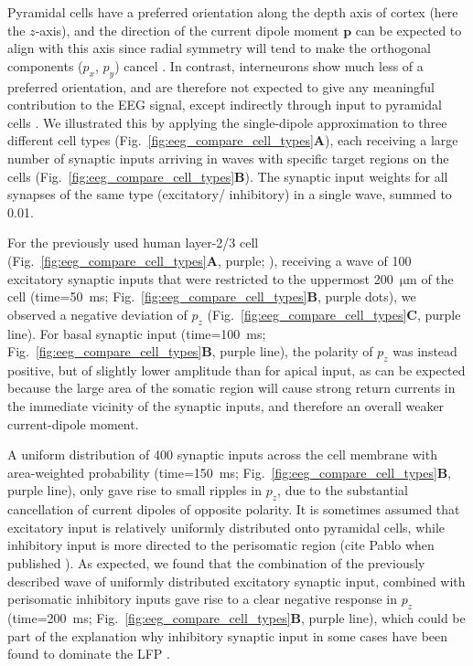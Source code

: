 \documentclass[preprint,10pt,authoryear]{elsarticle}
\begin{document}
Pyramidal cells have a preferred orientation along the depth axis of cortex (here the $z$-axis), and the direction of the current dipole moment $\mathbf{p}$ can be expected to align with this axis since
radial symmetry will tend to make the orthogonal components ($p_x$, $p_y$) cancel \citep{HAGEN2018}. 
In contrast, interneurons show much less of a preferred orientation, and are therefore not expected to give any meaningful contribution to the EEG signal, except indirectly through input to pyramidal cells \citep{HAGEN2016}.
We illustrated this by applying the single-dipole approximation to three different cell types (Fig.~\ref{fig:eeg_compare_cell_types}\textbf{A}), each receiving a large number of synaptic inputs arriving in waves with specific target regions on the cells (Fig.~\ref{fig:eeg_compare_cell_types}\textbf{B}). The synaptic input weights for all synapses of the same type (excitatory/ inhibitory) in a single wave, summed to 0.01.

For the previously used human layer-2/3 cell (Fig.~\ref{fig:eeg_compare_cell_types}\textbf{A}, purple; \cite{EYAL2016}),
receiving a wave of 100 excitatory synaptic inputs that were restricted to the uppermost 200~$\si{\um}$ of the cell (time=50~ms; Fig.~\ref{fig:eeg_compare_cell_types}\textbf{B}, purple dots), we observed a negative deviation of $p_z$ (Fig.~\ref{fig:eeg_compare_cell_types}\textbf{C}, purple line). For basal synaptic input (time=100~ms; Fig.~\ref{fig:eeg_compare_cell_types}\textbf{B}, purple line), the polarity of $p_z$ was instead positive, but of slightly lower amplitude than for apical input, as can be expected because the large area of the somatic region will cause strong return currents in the immediate vicinity of the synaptic inputs, and therefore an overall weaker current-dipole moment.


A uniform distribution of 400 synaptic inputs across the cell membrane with area-weighted probability (time=150~ms; Fig.~\ref{fig:eeg_compare_cell_types}\textbf{B}, purple line), only gave rise to small ripples in $p_z$, due to the substantial cancellation of current dipoles of opposite polarity. It is sometimes assumed that excitatory input is relatively uniformly distributed onto pyramidal cells, while inhibitory input is more directed to the perisomatic region (cite Pablo when published \citep{Mazzoni2015, Skaar2020biorxiv}). As expected, we found that the combination of the previously described wave of uniformly distributed excitatory synaptic input, combined with perisomatic inhibitory inputs gave rise to a clear negative response in $p_z$ (time=200~ms; Fig.~\ref{fig:eeg_compare_cell_types}\textbf{B}, purple line), which could be part of the explanation why inhibitory synaptic input in some cases have been found to dominate the LFP \citep{HAGEN2016, TELENCZUK2016}.
\end{document}
